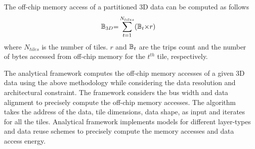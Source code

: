 The off-chip memory access of a partitioned 3D data can be computed as follows
\begin{align}\label{eq:BasicOffChip3DDataAccess}
	\mathbb{B}_{3D}{=}\sum_{t=1}^{N_{tiles}}(\mathbb{B}_{t}{\times}r)
\end{align}
where $N_{tiles}$ is the number of tiles. $r$ and $\mathbb{B}_{t}$ are the trips count and the number of bytes accessed from off-chip memory for the $t^{th}$ tile, respectively. 

The analytical framework computes the off-chip memory accesses of a given 3D data using the above methodology while considering the data resolution and architectural constraint. The framework considers the bus width and data alignment to precisely compute the off-chip memory accesses. The algorithm takes the
address of the data, tile dimensions, data shape, as input and iterates for all the tiles. Analytical framework implements models for different layer-types and data reuse schemes to precisely compute the memory accesses and data access energy. 

